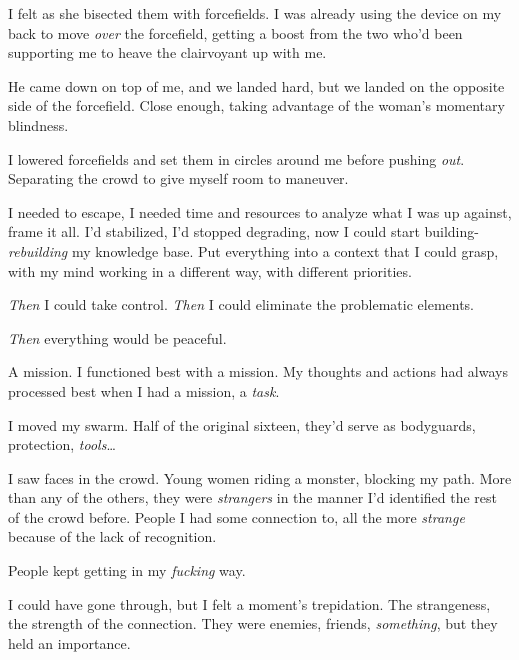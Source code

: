 I felt as she bisected them with forcefields.   I was already using the device on my back to move \emph{over} the forcefield, getting a boost from the two who'd been supporting me to heave the clairvoyant up with me.



He came down on top of me, and we landed hard, but we landed on the opposite side of the forcefield.  Close enough, taking advantage of the woman's momentary blindness.



I lowered forcefields and set them in circles around me before pushing \emph{out}.  Separating the crowd to give myself room to maneuver.



I needed to escape, I needed time and resources to analyze what I was up against, frame it all.  I'd stabilized, I'd stopped degrading, now I could start building- \emph{rebuilding }my knowledge base.  Put everything into a context that I could grasp, with my mind working in a different way, with different priorities.



\emph{Then} I could take control.  \emph{Then} I could eliminate the problematic elements.



\emph{Then} everything would be peaceful.



A mission.  I functioned best with a mission.  My thoughts and actions had always processed best when I had a mission, a \emph{task}.



I moved my swarm.  Half of the original sixteen, they'd serve as bodyguards, protection, \emph{tools}\ldots



I saw faces in the crowd.  Young women riding a monster, blocking my path.  More than any of the others, they were \emph{strangers} in the manner I'd identified the rest of the crowd before.  People I had some connection to, all the more \emph{strange} because of the lack of recognition.



People kept getting in my \emph{fucking} way.



I could have gone through, but I felt a moment's trepidation.  The strangeness, the strength of the connection.  They were enemies, friends, \emph{something}, but they held an importance.



